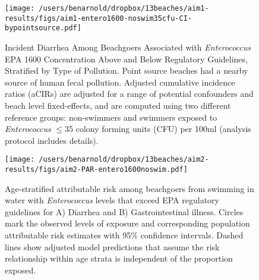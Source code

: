 \documentclass[11pt]{article}
\begin{document}
\begin{figure}[htbp]
\begin{center}
\texttt{[image: /users/benarnold/dropbox/13beaches/aim1-results/figs/aim1-entero1600-noswim35cfu-CI-bypointsource.pdf]} 
\begin{minipage}{\textwidth}
\caption{Incident Diarrhea Among Beachgoers Associated with \textit{Enterococcus} EPA 1600 Concentration Above and Below Regulatory Guidelines, Stratified by Type of Pollution. Point source beaches had a nearby source of human fecal pollution. Adjusted cumulative incidence ratios (aCIRs) are adjusted for a range of potential confounders and beach level fixed-effects, and are computed using two different reference groups: non-swimmers and swimmers exposed to \textit{Enterococcus} $\leq$35 colony forming units (CFU) per 100ml (analysis protocol includes details).}
\label{fig:enteroregulatory}
\end{minipage}
\end{center}
\end{figure}


\begin{figure}[htbp]
\begin{center}
\texttt{[image: /users/benarnold/dropbox/13beaches/aim2-results/figs/aim2-PAR-entero1600noswim.pdf]} 
\begin{minipage}{0.5\textwidth}
\caption{Age-stratified attributable risk among beachgoers from swimming in water with \textit{Enterococcus} levels that exceed EPA regulatory guidelines for A) Diarrhea and B) Gastrointestinal illness.  Circles mark the observed levels of exposure and corresponding population attributable risk estimates with 95\% confidence intervals. Dashed lines show adjusted model predictions that assume the risk relationship within age strata is independent of the proportion exposed.}
\label{fig:enteroPAR}
\end{minipage}
\end{center}
\end{figure}
\end{document}
